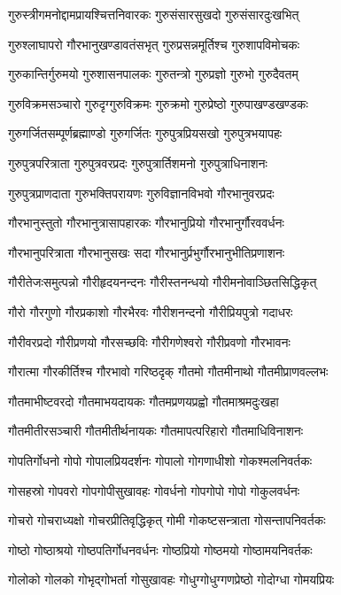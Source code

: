 \twolineshloka
{गुरुस्त्रीगमनोद्दामप्रायश्चित्तनिवारकः}%
{गुरुसंसारसुखदो गुरुसंसारदुःखभित्}%

\twolineshloka
{गुरुश्लाघापरो गौरभानुखण्डावतंसभृत्}%
{गुरुप्रसन्नमूर्तिश्च गुरुशापविमोचकः}%

\twolineshloka
{गुरुकान्तिर्गुरुमयो गुरुशासनपालकः}%
{गुरुतन्त्रो गुरुप्रज्ञो गुरुभो गुरुदैवतम्}%

\twolineshloka
{गुरुविक्रमसञ्चारो गुरुदृग्गुरुविक्रमः}%
{गुरुक्रमो गुरुप्रेष्ठो गुरुपाखण्डखण्डकः}%

\twolineshloka
{गुरुगर्जितसम्पूर्णब्रह्माण्डो गुरुगर्जितः}%
{गुरुपुत्रप्रियसखो गुरुपुत्रभयापहः}%

\twolineshloka
{गुरुपुत्रपरित्राता गुरुपुत्रवरप्रदः}%
{गुरुपुत्रार्तिशमनो गुरुपुत्राधिनाशनः}%

\twolineshloka
{गुरुपुत्रप्राणदाता गुरुभक्तिपरायणः}%
{गुरुविज्ञानविभवो गौरभानुवरप्रदः}%

\twolineshloka
{गौरभानुस्तुतो गौरभानुत्रासापहारकः}%
{गौरभानुप्रियो गौरभानुर्गौरववर्धनः}%

\twolineshloka
{गौरभानुपरित्राता गौरभानुसखः सदा}%
{गौरभानुर्प्रभुर्गौरभानुभीतिप्रणाशनः}%

\twolineshloka
{गौरीतेजःसमुत्पन्नो गौरीहृदयनन्दनः}%
{गौरीस्तनन्धयो गौरीमनोवाञ्छितसिद्धिकृत्}%

\twolineshloka
{गौरो गौरगुणो गौरप्रकाशो गौरभैरवः}%
{गौरीशनन्दनो गौरीप्रियपुत्रो गदाधरः}%

\twolineshloka
{गौरीवरप्रदो गौरीप्रणयो गौरसच्छविः}%
{गौरीगणेश्वरो गौरीप्रवणो गौरभावनः}%

\twolineshloka
{गौरात्मा गौरकीर्तिश्च गौरभावो गरिष्ठदृक्}%
{गौतमो गौतमीनाथो गौतमीप्राणवल्लभः}%

\twolineshloka
{गौतमाभीष्टवरदो गौतमाभयदायकः}%
{गौतमप्रणयप्रह्वो गौतमाश्रमदुःखहा}%

\twolineshloka
{गौतमीतीरसञ्चारी गौतमीतीर्थनायकः}%
{गौतमापत्परिहारो गौतमाधिविनाशनः}%

\twolineshloka
{गोपतिर्गोधनो गोपो गोपालप्रियदर्शनः}%
{गोपालो गोगणाधीशो गोकश्मलनिवर्तकः}%

\twolineshloka
{गोसहस्रो गोपवरो गोपगोपीसुखावहः}%
{गोवर्धनो गोपगोपो गोपो गोकुलवर्धनः}%

\twolineshloka
{गोचरो गोचराध्यक्षो गोचरप्रीतिवृद्धिकृत्}%
{गोमी गोकष्टसन्त्राता गोसन्तापनिवर्तकः}%

\twolineshloka
{गोष्ठो गोष्ठाश्रयो गोष्ठपतिर्गोधनवर्धनः}%
{गोष्ठप्रियो गोष्ठमयो गोष्ठामयनिवर्तकः}%

\twolineshloka
{गोलोको गोलको गोभृद्गोभर्ता गोसुखावहः}%
{गोधुग्गोधुग्गणप्रेष्ठो गोदोग्धा गोमयप्रियः}%

